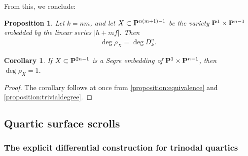 \documentclass[11pt,reqno]{amsart}
\theoremstyle{plain}
\newtheorem{proposition}[theorem]{Proposition}
\newtheorem{corollary}[theorem]{Corollary}
\theoremstyle{definition}
\theoremstyle{remark}
\numberwithin{equation}{section}
\renewcommand{\to}{{\longrightarrow}}
\numberwithin{equation}{section}
\newcommand{\smvee}{\raise0.5ex\hbox{$\scriptscriptstyle\vee$}}
\begin{document}
\begin{center}
\end{center}

From this, we conclude: 
\begin{proposition}\label{proposition:equivalence}
  Let $k = nm$, and let $X \subset \P^{n(m+1)-1}$ be the variety $\P^{1} \times \P^{n-1}$ embedded by the linear series $|h+mf|$. Then 
  \begin{align*}
    \deg \rho_{X} = \deg D^{n}_{k}.
  \end{align*}
\end{proposition}

\begin{corollary}
  If $X \subset \P^{2n-1}$ is a Segre embedding of $\P^{1} \times \P^{n-1}$, then $\deg \rho_{X} = 1$.
\end{corollary} 

\begin{proof}
  The corollary follows at once from \autoref{proposition:equivalence} and \autoref{proposition:trivialdegree}.
\end{proof}

\subsection{Quartic surface scrolls}





\subsubsection{The explicit differential construction for trinodal quartics}
\end{document}
